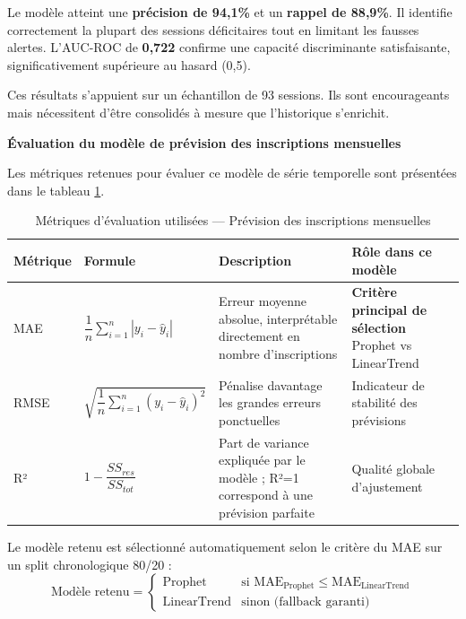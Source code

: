 \noindent Le modèle atteint une \textbf{précision de 94,1\%} et un \textbf{rappel de 88,9\%}. Il identifie correctement la plupart des sessions déficitaires tout en limitant les fausses alertes. L'AUC-ROC de \textbf{0,722} confirme une capacité discriminante satisfaisante, significativement supérieure au hasard (0,5).

\noindent Ces résultats s'appuient sur un échantillon de 93 sessions. Ils sont encourageants mais nécessitent d'être consolidés à mesure que l'historique s'enrichit.

\vspace{0.3cm}
\noindent\textbf{Évaluation du modèle de prévision des inscriptions mensuelles}

\noindent Les métriques retenues pour évaluer ce modèle de série temporelle sont présentées dans le tableau \ref{tab:metriques_forecast}.

\begin{table}[H]
\centering
\caption{Métriques d'évaluation utilisées — Prévision des inscriptions mensuelles}
\label{tab:metriques_forecast}
\begin{tabular}{|l|p{4cm}|p{4cm}|p{3.5cm}|}
\hline
\textbf{Métrique} & \textbf{Formule} & \textbf{Description} & \textbf{Rôle dans ce modèle} \\
\hline
MAE & $\dfrac{1}{n}\displaystyle\sum_{i=1}^{n}|y_i - \hat{y}_i|$ & Erreur moyenne absolue, interprétable directement en nombre d'inscriptions & \textbf{Critère principal de sélection} Prophet vs LinearTrend \\
\hline
RMSE & $\sqrt{\dfrac{1}{n}\displaystyle\sum_{i=1}^{n}(y_i - \hat{y}_i)^2}$ & Pénalise davantage les grandes erreurs ponctuelles & Indicateur de stabilité des prévisions \\
\hline
R² & $1 - \dfrac{SS_{res}}{SS_{tot}}$ & Part de variance expliquée par le modèle ; R²=1 correspond à une prévision parfaite & Qualité globale d'ajustement \\
\hline
\end{tabular}
\end{table}

\noindent Le modèle retenu est sélectionné automatiquement selon le critère du MAE sur un split chronologique 80/20 :
\[
\text{Modèle retenu} =
\begin{cases}
\text{Prophet} & \text{si } \text{MAE}_{\text{Prophet}} \leq \text{MAE}_{\text{LinearTrend}} \\
\text{LinearTrend} & \text{sinon (fallback garanti)}
\end{cases}
\]

